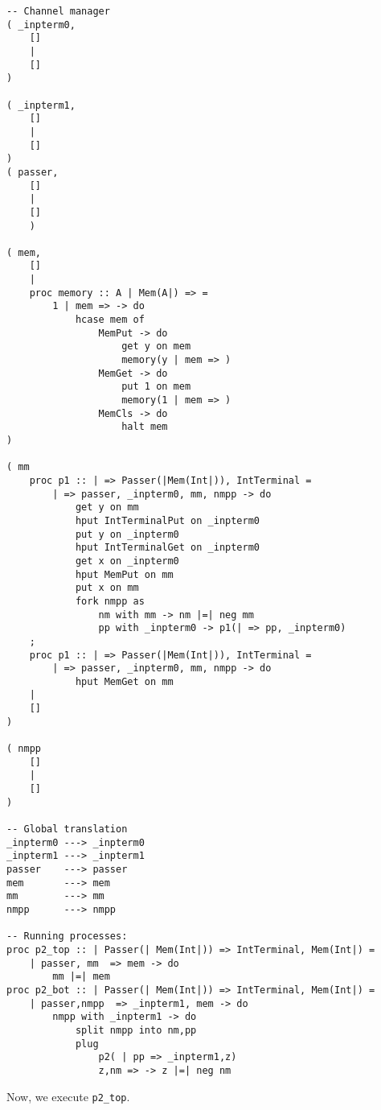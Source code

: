 \documentclass{article}
\theoremstyle{plain}%
\theoremstyle{definition}
\theoremstyle{remark}
\begin{document}
\begin{verbatim}
-- Channel manager
( _inpterm0,  
    []
    |
    []
)

( _inpterm1,  
    []
    |
    []
)
( passer,
    []
    |
    []
    )

( mem,
    []
    |
    proc memory :: A | Mem(A|) => =
        1 | mem => -> do
            hcase mem of
                MemPut -> do
                    get y on mem
                    memory(y | mem => )
                MemGet -> do
                    put 1 on mem
                    memory(1 | mem => )
                MemCls -> do
                    halt mem
)

( mm
    proc p1 :: | => Passer(|Mem(Int|)), IntTerminal = 
        | => passer, _inpterm0, mm, nmpp -> do
            get y on mm
            hput IntTerminalPut on _inpterm0
            put y on _inpterm0
            hput IntTerminalGet on _inpterm0
            get x on _inpterm0
            hput MemPut on mm
            put x on mm
            fork nmpp as
                nm with mm -> nm |=| neg mm
                pp with _inpterm0 -> p1(| => pp, _inpterm0)
    ;
    proc p1 :: | => Passer(|Mem(Int|)), IntTerminal = 
        | => passer, _inpterm0, mm, nmpp -> do
            hput MemGet on mm 
    |
    []
)

( nmpp
    []
    |
    []
)

-- Global translation
_inpterm0 ---> _inpterm0 
_inpterm1 ---> _inpterm1 
passer    ---> passer 
mem       ---> mem
mm        ---> mm
nmpp      ---> nmpp

-- Running processes:
proc p2_top :: | Passer(| Mem(Int|)) => IntTerminal, Mem(Int|) =
    | passer, mm  => mem -> do
        mm |=| mem
proc p2_bot :: | Passer(| Mem(Int|)) => IntTerminal, Mem(Int|) =
    | passer,nmpp  => _inpterm1, mem -> do
        nmpp with _inpterm1 -> do
            split nmpp into nm,pp
            plug
                p2( | pp => _inpterm1,z)
                z,nm => -> z |=| neg nm
\end{verbatim}
Now, we execute \verb|p2_top|. 
\end{document}
